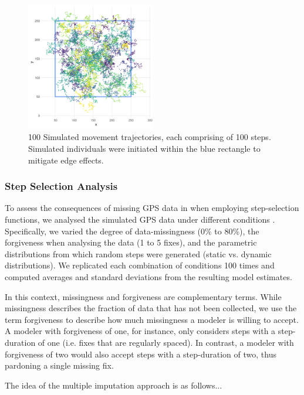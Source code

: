 \documentclass[abstract=on,10pt,a4paper,bibliography=totocnumbered]{article}
\begin{document}
\begin{figure}
  \begin{center}
  \includegraphics[width = 0.5\textwidth]{99_Simulations.png}
  \caption{100 Simulated movement trajectories, each comprising of 100 steps.
  Simulated individuals were initiated within the blue rectangle to mitigate
  edge effects.}
  \label{Simulations}
  \end{center}
\end{figure}

\subsubsection{Step Selection Analysis}
To assess the consequences of missing GPS data in when employing step-selection
functions, we analysed the simulated GPS data under different conditions
. Specifically, we varied the degree of data-missingness (0\% to
80\%), the forgiveness when analysing the data (1 to 5 fixes), and the
parametric distributions from which random steps were generated (static vs.
dynamic distributions). We replicated each combination of conditions 100 times
and computed averages and standard deviations from the resulting model
estimates.

In this context, missingness and forgiveness are complementary terms. While
missingness describes the fraction of data that has not been collected, we use
the term forgiveness to describe how much missingness a modeler is willing to
accept. A modeler with forgiveness of one, for instance, only considers steps
with a step-duration of one (i.e. fixes that are regularly spaced). In contrast,
a modeler with forgiveness of two would also accept steps with a step-duration
of two, thus pardoning a single missing fix.

The idea of the multiple imputation approach is as follows...
\end{document}
